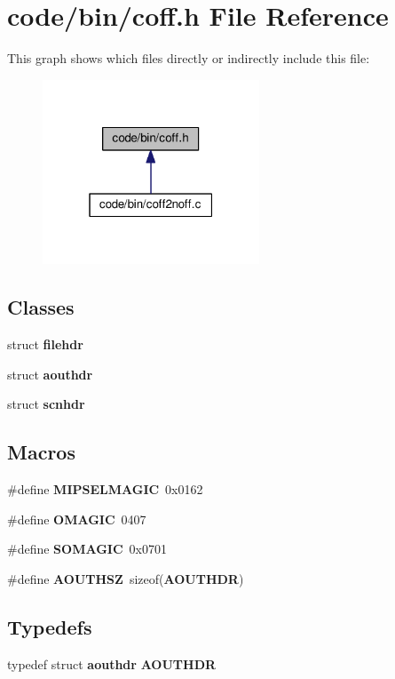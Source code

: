 \section{code/bin/coff.h File Reference}
\label{coff_8h}
This graph shows which files directly or indirectly include this file\+:
\nopagebreak
\begin{figure}[H]
\begin{center}
\leavevmode
\includegraphics[width=183pt]{coff_8h__dep__incl}
\end{center}
\end{figure}
\subsection*{Classes}
\begin{DoxyCompactItemize}
\item 
struct {\bf filehdr}
\item 
struct {\bf aouthdr}
\item 
struct {\bf scnhdr}
\end{DoxyCompactItemize}
\subsection*{Macros}
\begin{DoxyCompactItemize}
\item 
\#define {\bf M\+I\+P\+S\+E\+L\+M\+A\+G\+IC}~0x0162
\item 
\#define {\bf O\+M\+A\+G\+IC}~0407
\item 
\#define {\bf S\+O\+M\+A\+G\+IC}~0x0701
\item 
\#define {\bf A\+O\+U\+T\+H\+SZ}~sizeof({\bf A\+O\+U\+T\+H\+DR})
\end{DoxyCompactItemize}
\subsection*{Typedefs}
\begin{DoxyCompactItemize}
\item 
typedef struct {\bf aouthdr} {\bf A\+O\+U\+T\+H\+DR}
\end{DoxyCompactItemize}


